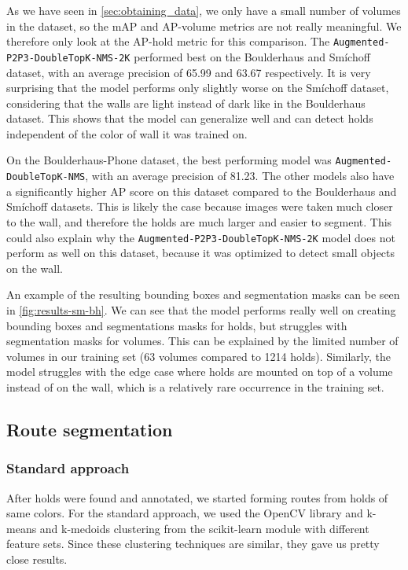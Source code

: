 \documentclass[final]{cvpr}
\begin{document}
As we have seen in \autoref{sec:obtaining_data}, we only have a small number of volumes in the dataset, so the mAP and AP-volume metrics are not really meaningful.
We therefore only look at the AP-hold metric for this comparison.
The \texttt{Augmented-P2P3-DoubleTopK-NMS-2K} performed best on the Boulderhaus and Smíchoff dataset, with an average precision of 65.99 and 63.67 respectively. It is very surprising that the model performs only slightly worse on the Smíchoff dataset, considering that the walls are light instead of dark like in the Boulderhaus dataset. This shows that the model can generalize well and can detect holds independent of the color of wall it was trained on.

On the Boulderhaus-Phone dataset, the best performing model was \texttt{Augmented-DoubleTopK-NMS}, with an average precision of 81.23. The other models also have a significantly higher AP score on this dataset compared to the Boulderhaus and Smíchoff datasets. This is likely the case because images were taken much closer to the wall, and therefore the holds are much larger and easier to segment. This could also explain why the \texttt{Augmented-P2P3-DoubleTopK-NMS-2K} model does not perform as well on this dataset, because it was optimized to detect small objects on the wall.

An example of the resulting bounding boxes and segmentation masks can be seen in \autoref{fig:results-sm-bh}. We can see that the model performs really well on creating bounding boxes and segmentations masks for holds, but struggles with segmentation masks for volumes. This can be explained by the limited number of volumes in our training set (63 volumes compared to 1214 holds). Similarly, the model struggles with the edge case where holds are mounted on top of a volume instead of on the wall, which is a relatively rare occurrence in the training set.



\subsection{Route segmentation}

\subsubsection{Standard approach} %
After holds were found and annotated, we started forming routes from holds of same colors. For the standard approach, we used the OpenCV library \cite{opencv} and k-means and k-medoids clustering from the scikit-learn module \cite{scikit} with different feature sets. Since these clustering techniques are similar, they gave us pretty close results.
\end{document}
